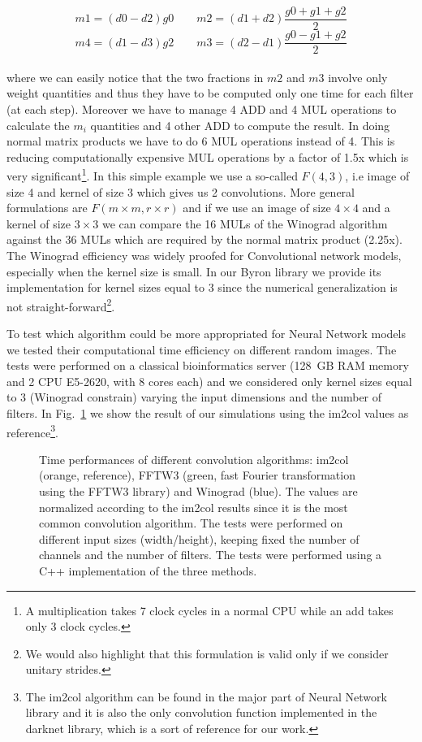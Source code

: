 \documentclass{standalone}
\begin{document}
$$
m1 = (d0 - d2)g0\quad\quad m2 = (d1 + d2)\frac{g0 + g1 + g2}{2}
$$
$$
m4 = (d1 - d3)g2\quad\quad m3 = (d2 - d1)\frac{g0 - g1 + g2}{2}
$$
\\
where we can easily notice that the two fractions in $m2$ and $m3$ involve only weight quantities and thus they have to be computed only one time for each filter (at each step).
Moreover we have to manage 4 ADD and 4 MUL operations to calculate the $m_i$ quantities and 4 other ADD to compute the result.
In doing normal matrix products we have to do 6 MUL operations instead of 4.
This is reducing computationally expensive MUL operations by a factor of 1.5x which is very significant\footnote{
  A multiplication takes 7 clock cycles in a normal CPU while an add takes only 3 clock cycles.
}.
In this simple example we use a so-called $F(4, 3)$, i.e image of size 4 and kernel of size 3 which gives us 2 convolutions.
More general formulations are $F(m\times m, r \times r)$ and if we use an image of size $4\times4$ and a kernel of size $3\times3$ we can compare the 16 MULs of the Winograd algorithm against the 36 MULs which are required by the normal matrix product (2.25x).
The Winograd efficiency was widely proofed for Convolutional network models, especially when the kernel size is small.
In our Byron library we provide its implementation for kernel sizes equal to 3 since the numerical generalization is not straight-forward\footnote{
  We would also highlight that this formulation is valid only if we consider unitary strides.
}.

To test which algorithm could be more appropriated for Neural Network models we tested their computational time efficiency on different random images.
The tests were performed on a classical bioinformatics server (128~GB RAM memory and 2 CPU E5-2620, with 8 cores each) and we considered only kernel sizes equal to 3 (Winograd constrain) varying the input dimensions and the number of filters.
In Fig.~\ref{fig:winograd_timing} we show the result of our simulations using the \textsf{im2col} values as reference\footnote{
  The \textsf{im2col} algorithm can be found in the major part of Neural Network library and it is also the only convolution function implemented in the \textsf{darknet} library, which is a sort of reference for our work.
}.

\begin{figure}[htbp]
\centering
\def\svgwidth{0.8\textwidth}

\caption{Time performances of different convolution algorithms: \textsf{im2col} (orange, reference), \textsf{FFTW3} (green, fast Fourier transformation using the FFTW3 library) and \textsf{Winograd} (blue).
The values are normalized according to the \textsf{im2col} results since it is the most common convolution algorithm.
The tests were performed on different input sizes (width/height), keeping fixed the number of channels and the number of filters.
The tests were performed using a C++ implementation of the three methods.
}
\label{fig:winograd_timing}
\end{figure}
\end{document}
